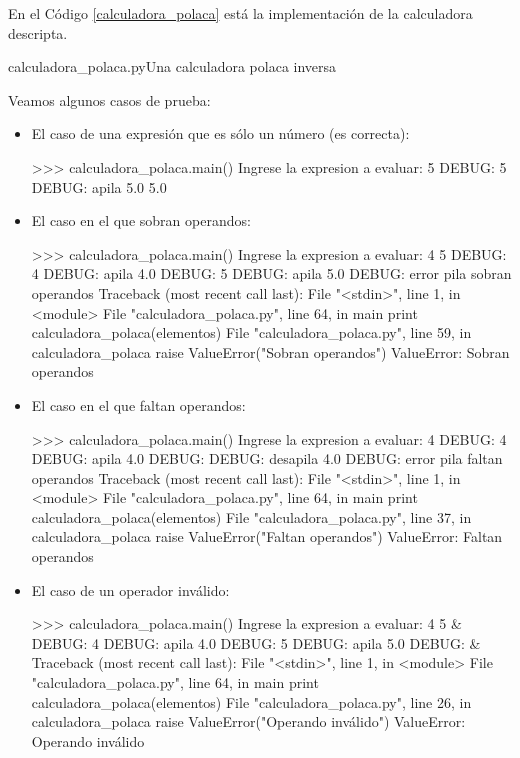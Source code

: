 En el Código \ref{calculadora_polaca} está la implementación de la
calculadora descripta.

\begin{codigo}{\label{calculadora_polaca} calculadora\_polaca.py}{Una calculadora polaca inversa}

\end{codigo}

Veamos algunos casos de prueba:

\begin{itemize}
\item El caso de una expresión que es sólo un número (es correcta):

\begin{codigo-python-sn}
>>> calculadora_polaca.main()
Ingrese la expresion a evaluar: 5
DEBUG: 5
DEBUG: apila  5.0
5.0
\end{codigo-python-sn}

\item El caso en el que sobran operandos:

\begin{codigo-python-sn}
>>> calculadora_polaca.main()
Ingrese la expresion a evaluar: 4 5
DEBUG: 4
DEBUG: apila  4.0
DEBUG: 5
DEBUG: apila  5.0
DEBUG: error pila sobran operandos
Traceback (most recent call last):
  File "<stdin>", line 1, in <module>
  File "calculadora_polaca.py", line 64, in main
    print calculadora_polaca(elementos)
  File "calculadora_polaca.py", line 59, in calculadora_polaca
    raise ValueError("Sobran operandos")
ValueError: Sobran operandos
\end{codigo-python-sn}

\item El caso en el que faltan operandos:

\begin{codigo-python-sn}
>>> calculadora_polaca.main()
Ingrese la expresion a evaluar: 4 %
DEBUG: 4
DEBUG: apila  4.0
DEBUG: %
DEBUG: desapila  4.0
DEBUG: error pila faltan operandos
Traceback (most recent call last):
  File "<stdin>", line 1, in <module>
  File "calculadora_polaca.py", line 64, in main
    print calculadora_polaca(elementos)
  File "calculadora_polaca.py", line 37, in calculadora_polaca
    raise ValueError("Faltan operandos")
ValueError: Faltan operandos
\end{codigo-python-sn}

\item El caso de un operador inválido:

\begin{codigo-python-sn}
>>> calculadora_polaca.main()
Ingrese la expresion a evaluar: 4 5 &
DEBUG: 4
DEBUG: apila  4.0
DEBUG: 5
DEBUG: apila  5.0
DEBUG: &
Traceback (most recent call last):
  File "<stdin>", line 1, in <module>
  File "calculadora_polaca.py", line 64, in main
    print calculadora_polaca(elementos)
  File "calculadora_polaca.py", line 26, in calculadora_polaca
    raise ValueError("Operando inválido")
ValueError: Operando inválido
\end{codigo-python-sn}


\end{itemize}
